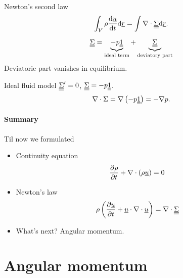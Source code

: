 \documentclass[11pt,oneside]{book}
\renewcommand{\vec}[1]{\underline{#1}}
\theoremstyle{definition} %
\theoremstyle{plain} %
\theoremstyle{remark} %
\theoremstyle{underline}
\begin{document}
  Newton's second law
  \begin{displaymath}
    \int_V \rho \dfrac{\vec u}{t} \d \vec r = \int\nabla \cdot \ten \Sigma \d \vec r.
  \end{displaymath}

  \begin{displaymath}
    \underline{\underline{{\Sigma}}} = \underbrace{- p \underline{\underline{1}}}_{\textrm{ideal term}} + \underbrace{\underline{\underline{\Sigma}}}_{\textrm{deviatory part}}
  \end{displaymath}
  Deviatoric part vanishes in equilibrium.

  Ideal fluid model $\underline{\underline{{\Sigma}}}' = 0$, $\underline{\underline{{\Sigma}}} = - p \underline{\underline{1}}$.
  \begin{displaymath}
    \nabla \cdot \Sigma = \nabla \left( - p \underline{\underline{1}} \right) = - \nabla p.
  \end{displaymath}

  \paragraph{Summary}
  Til now we formulated
  
  \begin{itemize}
    \item Continuity equation
      \begin{displaymath}
          \ptf{\rho}{t} + \nabla \cdot ( \rho \vec u ) = 0
      \end{displaymath}
    \item Newton's law
      \begin{displaymath}
        \rho \left( \ptf{\vec u }{t} + \vec u \cdot \nabla \cdot \vec u  \right) = \nabla \cdot \ten \Sigma
    \end{displaymath}
  \item What's next? Angular momentum.
  \end{itemize}

  \section{Angular momentum}
  \begin{figure}[h]
    \centering
  \end{figure}
\end{document}

